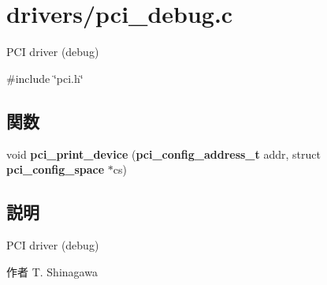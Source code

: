 \section{drivers/pci\-\_\-debug.c}
\label{pci__debug_8c}


\-P\-C\-I driver (debug)  


{\ttfamily \#include \char`\"{}pci.\-h\char`\"{}}\*
\subsection*{関数}
\begin{DoxyCompactItemize}
\item 
void {\bfseries pci\-\_\-print\-\_\-device} ({\bf pci\-\_\-config\-\_\-address\-\_\-t} addr, struct {\bf pci\-\_\-config\-\_\-space} $\ast$cs)\label{pci__debug_8c_a4a327333fb99caaf1cf43961218f3948}

\end{DoxyCompactItemize}


\subsection{説明}
\-P\-C\-I driver (debug) \begin{DoxyAuthor}{作者}
\-T. \-Shinagawa 
\end{DoxyAuthor}
